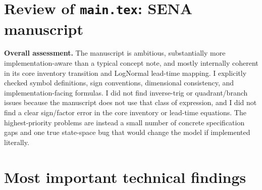 \documentclass[11pt]{article}
\begin{document}
\section*{Review of \texttt{main.tex}: SENA manuscript}

\textbf{Overall assessment.}
The manuscript is ambitious, substantially more implementation-aware than a typical concept note, and mostly internally coherent in its core inventory transition and LogNormal lead-time mapping.
I explicitly checked symbol definitions, sign conventions, dimensional consistency, and implementation-facing formulas.
I did not find inverse-trig or quadrant/branch issues because the manuscript does not use that class of expression, and I did not find a clear sign/factor error in the core inventory or lead-time equations.
The highest-priority problems are instead a small number of concrete specification gaps and one true state-space bug that would change the model if implemented literally.

\section*{Most important technical findings}
\end{document}
